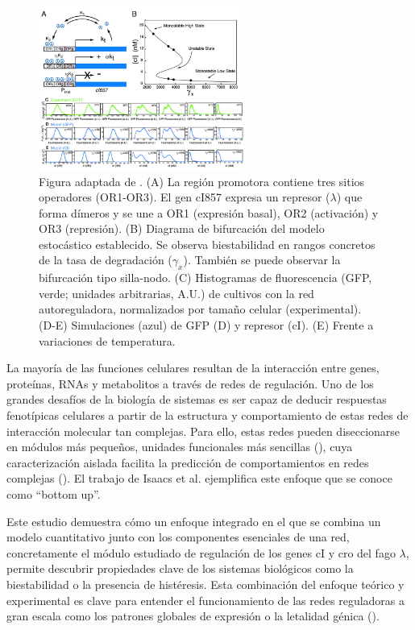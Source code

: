 \documentclass[nochap]{config/ejercicios}
\begin{document}
\begin{figure}[h]
\centering
\includegraphics[width = 0.6\textwidth]{figura_mod.png}
\caption{Figura adaptada de \cite{Isaacs2003}. (A) La región promotora contiene tres sitios operadores (OR1-OR3). El gen cI857 expresa un represor ($\lambda$) que forma dímeros y se une a OR1 (expresión basal), OR2 (activación) y OR3 (represión). (B) Diagrama de bifurcación del modelo estocástico establecido. Se observa biestabilidad en rangos concretos de la tasa de degradación ($\gamma_x$). También se puede observar la bifurcación tipo silla-nodo. (C) Histogramas de fluorescencia (GFP, verde; unidades arbitrarias, A.U.) de cultivos con la red autoreguladora, normalizados por tamaño celular (experimental). (D-E) Simulaciones (azul) de GFP (D) y represor (cI). (E) Frente a variaciones de temperatura.}
\end{figure}

La mayoría de las funciones celulares resultan de la interacción entre genes, proteínas, RNAs y metabolitos a través de redes de regulación. Uno de los grandes desafíos de la biología de sistemas es ser capaz de deducir respuestas fenotípicas celulares a partir de la estructura y comportamiento de estas redes de interacción molecular tan complejas. Para ello, estas redes pueden diseccionarse en módulos más pequeños, unidades funcionales más sencillas (\cite{Hartwell1999}), cuya caracterización aislada facilita la predicción de comportamientos en redes complejas (\cite{Arnone1997}). El trabajo de Isaacs et al. ejemplifica este enfoque que se conoce como “bottom up”.

Este estudio demuestra cómo un enfoque integrado en el que se combina un modelo cuantitativo junto con los componentes esenciales de una red, concretamente el módulo estudiado de regulación de los genes cI y cro del fago $\lambda$, permite descubrir propiedades clave de los sistemas biológicos como la biestabilidad o la presencia de histéresis. Esta combinación del enfoque teórico y experimental es clave para entender el funcionamiento de las redes reguladoras a gran escala como los patrones globales de expresión o la letalidad génica (\cite{Hartwell1999}).
\end{document}

